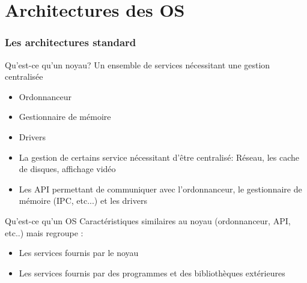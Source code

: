 \part{Architectures des OS}

\section{Les architectures standard}

\begin{frame}[fragile=singleslide]{Qu'est-ce qu'un noyau?}
  Un ensemble de services nécessitant une gestion centralisée
  \begin{itemize} 
  \item Ordonnanceur
  \item Gestionnaire de mémoire
  \item Drivers
  \item La gestion de  certains service nécessitant d'être centralisé:
    Réseau, les cache de disques, affichage vidéo
  \item  Les API  permettant  de communiquer  avec l'ordonnanceur,  le
    gestionnaire de mémoire (IPC, etc...) et les drivers
  \end{itemize} 
\end{frame} 

\begin{frame}[fragile=singleslide]{Qu'est-ce qu'un OS}
  Caractéristiques similaires au noyau (ordonnanceur, API, etc..) mais
  regroupe :
  \begin{itemize} 
  \item Les services fournis par le noyau
  \item Les  services fournis par des programmes  et des bibliothèques
    extérieures
  \end{itemize} 
\end{frame}


